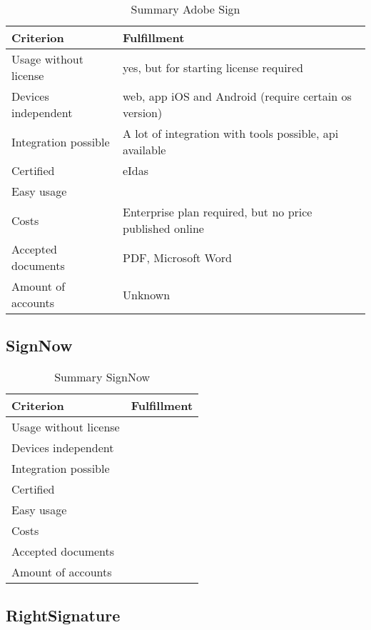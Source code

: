 \begin{table}[h]
	\begin{tabular}{|p{4cm}|p{10cm}|} \hline
		Criterion & Fulfillment \\ \hline
		Usage without license & yes, but for starting license required\\ \hline
		Devices independent & web, app iOS and Android (require certain os version) \\ \hline
		Integration possible & A lot of integration with tools possible, api available \parencite{adobesign2018integration,adobesign2018info} \\ \hline
		Certified & eIdas \parencite{adobesign2018legal} \\ \hline
		Easy usage & \\ \hline
		Costs & Enterprise plan required, but no price published online \parencite{adobesign2018costs} \\ \hline
		Accepted documents & PDF, Microsoft Word \parencite{adobesign2018info} \\ \hline
		Amount of accounts & Unknown \\ \hline
	\end{tabular}
	\caption{Summary Adobe Sign}
	\label{tab:adobesign}
\end{table}

\subsection{SignNow}

\begin{table}[h]
	\begin{tabular}{|p{4cm}|p{10cm}|} \hline
		Criterion & Fulfillment \\ \hline
		Usage without license & \\ \hline
		Devices independent & \\ \hline
		Integration possible & \\ \hline
		Certified & \\ \hline
		Easy usage & \\ \hline
		Costs & \\ \hline
		Accepted documents & \\ \hline
		Amount of accounts & \\ \hline
	\end{tabular}
	\caption{Summary SignNow}
	\label{tab:signnow}
\end{table}

\subsection{RightSignature}

